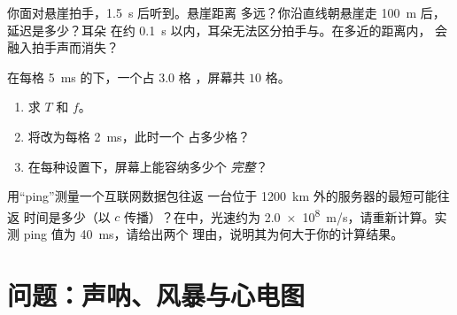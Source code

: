 \begin{exercise}[$\star\star\star$]\label{exo:g10:signals-and-waves:13}
你面对悬崖拍手，\qty{1.5}{s} 后听到。悬崖距离
多远？你沿直线朝悬崖走 \qty{100}{m} 后，延迟是多少？耳朵
在约 \qty{0.1}{s} 以内，耳朵无法区分拍手与。在多近的距离内，
会融入拍手声而消失？
\end{exercise}

\begin{exercise}[$\star\star\star$]\label{exo:g10:signals-and-waves:14}
在每格 \qty{5}{ms} 的下，一个占 $3.0$ 格
，屏幕共 $10$ 格。
\begin{enumerate}
  \item 求 $T$ 和 $f$。
  \item 将改为每格 \qty{2}{ms}，此时一个
        占多少格？
  \item 在每种设置下，屏幕上能容纳多少个
        \emph{完整}？
\end{enumerate}
\end{exercise}

\begin{exercise}[$\star\star\star$]\label{exo:g10:signals-and-waves:15}
用“ping”测量一个互联网数据包往返
一台位于 \qty{1200}{km} 外的服务器的最短可能往返
时间是多少（以 $c$ 传播）？在中，光速约为
\qty{2.0e8}{m/s}，请重新计算。实测 ping 值为 \qty{40}{ms}，请给出两个
理由，说明其为何大于你的计算结果。
\end{exercise}

\section{问题：声呐、风暴与心电图}

